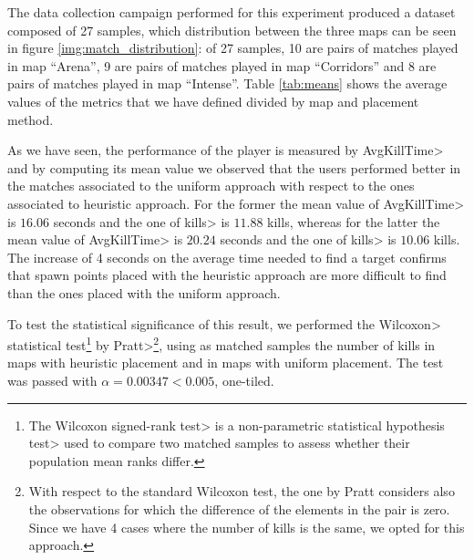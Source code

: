 The data collection campaign performed for this experiment produced a dataset composed of 27 samples, which distribution between the three maps can be seen in figure \ref{img:match_distribution}: of 27 samples, 10 are pairs of matches played in map ``Arena'', 9 are pairs of matches played in map ``Corridors'' and 8 are pairs of matches played in map ``Intense''. Table \ref{tab:means} shows the average values of the metrics that we have defined divided by map and placement method.

\par

As we have seen, the performance of the player is measured by \<AvgKillTime> and by computing its mean value we observed that the users performed better in the matches associated to the uniform approach with respect to the ones associated to heuristic approach. For the former the mean value of \<AvgKillTime> is $16.06$ seconds and the one of \<kills> is $11.88$ kills, whereas for the latter the mean value of \<AvgKillTime> is $20.24$ seconds and the one of \<kills> is $10.06$ kills. The increase of 4 seconds on the average time needed to find a target confirms that spawn points placed with the heuristic approach are more difficult to find than the ones placed with the uniform approach.

\par

To test the statistical significance of this result, we performed the \<Wilcoxon> statistical test\footnote{The \<Wilcoxon signed-rank test> is a \<non-parametric statistical hypothesis test> used to compare two matched samples to assess whether their population mean ranks differ.} by \<Pratt>\footnote{With respect to the standard Wilcoxon test, the one by Pratt considers also the observations for which the difference of the elements in the pair is zero. Since we have 4 cases where the number of kills is the same, we opted for this approach.}, using as matched samples the number of kills in maps with heuristic placement and in maps with uniform placement. The test was passed with $\alpha = 0.00347 < 0.005$, one-tiled.

